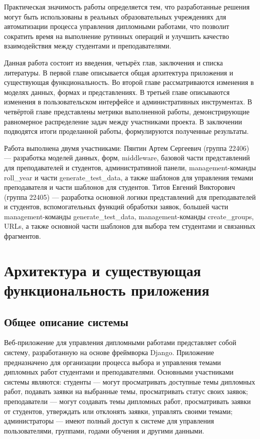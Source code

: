 \documentclass[a4paper,12pt]{article}
\begin{document}
Практическая значимость работы определяется тем, что разработанные решения могут быть использованы в реальных образовательных учреждениях для автоматизации процесса управления дипломными работами, что позволит сократить время на выполнение рутинных операций и улучшить качество взаимодействия между студентами и преподавателями.

Данная работа состоит из введения, четырёх глав, заключения и списка литературы. В первой главе описывается общая архитектура приложения и существующая функциональность. Во второй главе рассматриваются изменения в моделях данных, формах и представлениях. В третьей главе описываются изменения в пользовательском интерфейсе и административных инструментах. В четвёртой главе представлены метрики выполненной работы, демонстрирующие равномерное распределение задач между участниками проекта. В заключении подводятся итоги проделанной работы, формулируются полученные результаты.

Работа выполнена двумя участниками: Пянтин Артем Сергеевич (группа 22406) — разработка моделей данных, форм, middleware, базовой части представлений для преподавателей и студентов, административной панели, management-команды roll\_year и части generate\_test\_data, а также шаблонов для управления темами преподавателя и части шаблонов для студентов. Титов Евгений Викторович (группа 22405) — разработка основной логики представлений для преподавателей и студентов, вспомогательных функций обработки заявок, большей части management-команды generate\_test\_data, management-команды create\_groups, URLs, а также основной части шаблонов для выбора тем студентами и связанных фрагментов.

\newpage
\section{Архитектура и существующая функциональность приложения}

\subsection{Общее описание системы}

Веб-приложение для управления дипломными работами представляет собой систему, разработанную на основе фреймворка Django. Приложение предназначено для организации процесса выбора и управления темами дипломных работ студентами и преподавателями. Основными участниками системы являются: студенты — могут просматривать доступные темы дипломных работ, подавать заявки на выбранные темы, просматривать статус своих заявок; преподаватели — могут создавать темы дипломных работ, просматривать заявки от студентов, утверждать или отклонять заявки, управлять своими темами; администраторы — имеют полный доступ к системе для управления пользователями, группами, годами обучения и другими данными.
\end{document}
